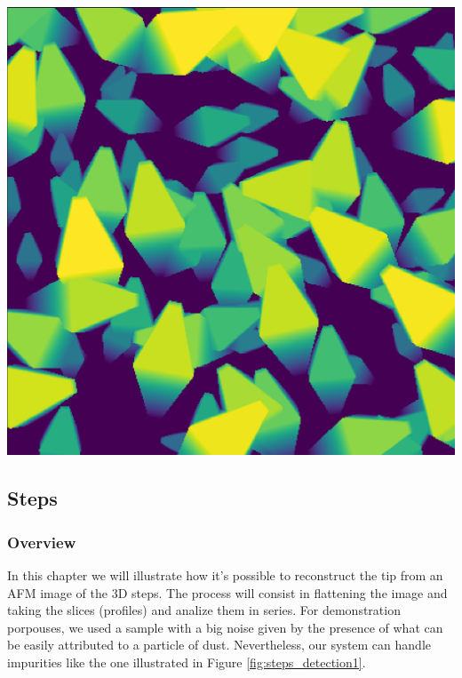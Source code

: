 \documentclass{article}
\begin{document}
\begin{center}
\begin{minipage}{0.3\textwidth}
    \end{minipage}
    \hfill
    \begin{minipage}{0.3\textwidth}
        \includegraphics*[width=\linewidth]{../images/bipiramid_statistica.png}
    \end{minipage}
\end{center}

\newpage

\subsection{Steps}\label{subsec:Steps}

\subsubsection{Overview}\label{subsubsec:Step_overview}
In this chapter we will illustrate how it's possible to reconstruct the tip from an AFM image of the 3D steps. The process will consist in flattening the image and taking the slices (profiles) and analize them in series. For demonstration porpouses, we used a sample with a big noise given by the presence of what can be easily attributed to a particle of dust. Nevertheless, our system can handle impurities like the one illustrated in Figure \ref{fig:steps_detection1}. 
\end{document}

